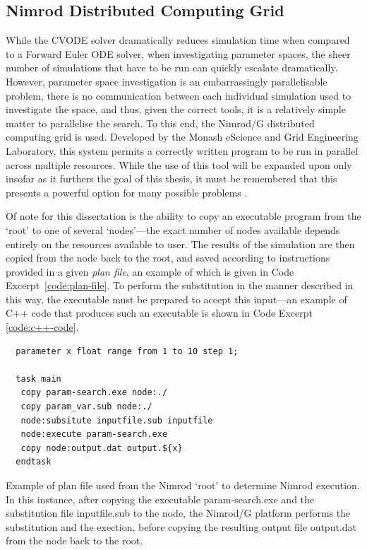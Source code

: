 \documentclass[../thesis-main.tex]{subfiles}
\begin{document}
\subsection{Nimrod Distributed Computing Grid}
\label{subsec:nimrod}
While the CVODE solver dramatically reduces simulation time when compared to a Forward Euler ODE solver, when investigating parameter spaces, the sheer number of simulations that have to be run can quickly escalate dramatically. However, parameter space investigation is an embarrassingly parallelisable problem, \idest{} there is no communication between each individual simulation used to investigate the space, and thus, given the correct tools, it is a relatively simple matter to parallelise the search. To this end, the Nimrod/G distributed computing grid \citep{Abramson2000, Abramson2010} is used. Developed by the Monash eScience and Grid Engineering Laboratory, this system permits a correctly written program to be run in parallel across multiple resources. While the use of this tool will be expanded upon only insofar as it furthers the goal of this thesis, it must be remembered that this presents a powerful option for many possible problems \citep{Abramson2011, Abramson2009}.

Of note for this dissertation is the ability to copy an executable program from the `root' to one of several `nodes'---the exact number of nodes available depends entirely on the resources available to user. The results of the simulation are then copied from the node back to the root, and saved according to instructions provided in a given \emph{plan file}, an example of which is given in Code Excerpt~\ref{code:plan-file}. To perform the substitution in the manner described in this way, the executable must be prepared to accept this input---an example of C++ code that produces such an executable is shown in Code Excerpt \ref{code:c++-code}.
\begin{listing}[tb]
 \begin{verbatim}
  parameter x float range from 1 to 10 step 1;

  task main
   copy param-search.exe node:./
   copy param_var.sub node:./
   node:subsitute inputfile.sub inputfile
   node:execute param-search.exe
   copy node:output.dat output.${x}
  endtask
 \end{verbatim}
 \caption[Nimrod/G code: Plan File]{Example of plan file used from the Nimrod `root' to determine Nimrod execution. In this instance, after copying the executable param-search.exe and the substitution file inputfile.sub to the node, the Nimrod/G platform performs the substitution and the exection, before copying the resulting output file output.dat from the node back to the root.}
 \label{code:plan-file}
\end{listing}
\end{document}
